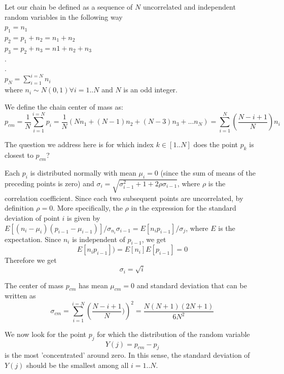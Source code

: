 \documentclass{report}
\begin{document}
Let our chain be defined as a sequence of $N$ uncorrelated and independent random variables in the following way\\
$p_1 = n_1$\\
$p_2 = p_1+n_2=n_1+n_2$\\
$p_3 = p_2+n_3=n1+n_2+n_3$\\
.\\
.\\
$p_N = \sum_{i=1}^{i=N}n_i$\\
where $n_i\sim N(0,1)\forall i=1..N$ and $N$ is an odd integer.

We define the chain center of mass as:
\begin{equation*}
p_{cm}=\frac{1}{N}\sum_{i=1}^{i=N}p_i = \frac{1}{N}(Nn_1+(N-1)n_2+(N-3)n_3+...n_N)=\sum_{i=1}^{N}(\frac{N-i+1}{N})n_i
\end{equation*}

The question we address here is for which index $k\in[1..N]$ does the point $p_k$ is closest to $p_{cm}$?

Each $p_i$ is distributed normally with mean $\mu_i =0$ (since the sum of means of the preceding points is zero) and $\sigma_i=\sqrt{\sigma_{i-1}^2+1+2\rho\sigma_{i-1}}$, where $\rho$ is the correlation coefficient. Since each two subsequent points are uncorrelated, by definition $\rho=0$. More specifically, the $\rho$ in the expression for the standard deviation of point $i$ is given by $E[(n_i-\mu_i)(p_{i-1}-\mu_{i-1})]/\sigma_{n_i}\sigma_{i-1}=E[n_ip_{i-1}]/\sigma_j$, where $E$ is the expectation. Since $n_i$ is independent of $p_{i-1}$, we get
\begin{equation*}
E[n_ip_{i-1}])=E[n_i]E[p_{i-1}]=0
\end{equation*}
Therefore we get 
\begin{equation*}
\sigma_i=\sqrt{i}
\end{equation*}

The center of mass $p_{cm}$ has mean $\mu_{cm}=0$ and standard deviation that can be written as
\begin{equation*}
\sigma_{cm}=\sum_{i=1}^{i=N}\left( \frac{N-i+1}{N}) \right)^2 = \frac{N(N+1)(2N+1)}{6N^2}
\end{equation*}

We now look for the point $p_j$ for which the distribution of the random variable 
\begin{equation*}
Y(j)=p_{cm}-p_j
\end{equation*}
is the most 'concentrated' around zero. 
In this sense, the standard deviation of $Y(j)$ should be the smallest among all $i=1..N$.
\end{document}

